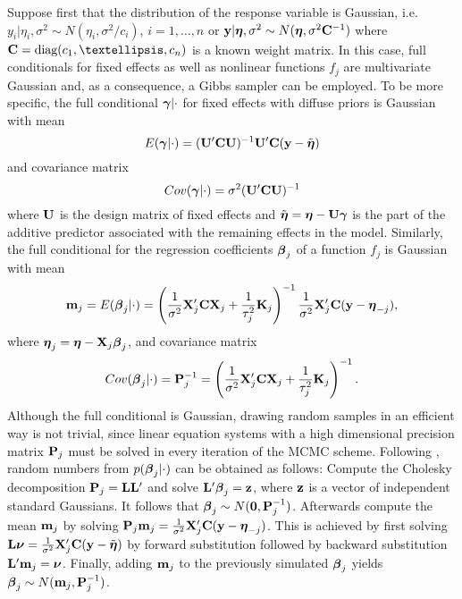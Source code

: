 \documentclass[11pt,a4paper,twoside]{bayesxarticle}
\begin{document}
Suppose first that the distribution of the response variable is
Gaussian, i.e. $y_i | \eta_i, \sigma^2 \sim N(\eta_i,\sigma^2/c_i)$,
$i=1,\dots,n$ or $\mathbf{y} | \boldsymbol{\eta}, \sigma^2 \sim N(\boldsymbol{\eta},\sigma^2 \mathbf{C}^{-1})$
where $\Cvec = \diag(c_1,\dots,c_n)$ is a known weight matrix. In this
case, full conditionals for fixed effects as well as nonlinear
functions $f_j$ are multivariate Gaussian and, as a consequence, a
Gibbs sampler can be employed. To be more specific, the full
conditional $\boldsymbol{\gamma} | \cdot$ for fixed effects with diffuse priors
is Gaussian with mean
\begin{equation}\label{meanfixed}
 E(\gammavec | \cdot) = (\Uvec'\Cvec  \Uvec)^{-1}\Uvec'\Cvec(\yvec-\tilde{\etavec})
\end{equation}
and covariance matrix
\begin{equation}
\label{covfixed} Cov(\gammavec | \cdot ) = \sigma^2 (\Uvec'\Cvec \Uvec)^{-1}
\end{equation}
where $\mathbf{U}$ is the design matrix of fixed effects and
$\tilde{\boldsymbol{\eta}}=\boldsymbol{\eta}-\mathbf{U} \boldsymbol{\gamma}$ is the part of the additive predictor
associated with the remaining effects in the model. Similarly, the
full conditional for the regression coefficients $\boldsymbol{\beta}_j$ of a
function $f_j$ is Gaussian with mean
\begin{equation}
\label{meangaussian} \mvec_j = E(\betavec_j | \cdot) = \left(
\frac{1}{\sigma^2} \Xvec_j' \Cvec \Xvec_j + \frac{1}{\tau_j^2} \Kvec_j \right)^{-1}
\frac{1}{\sigma^2}\Xvec_j' \Cvec(\yvec-\etavec_{-j}),
\end{equation}
where $\boldsymbol{\eta}_j=\boldsymbol{\eta}-\mathbf{X}_j\boldsymbol{\beta}_j$, and covariance matrix
\begin{equation}
\label{covgaussian} Cov(\betavec_j | \cdot) = \Pvec_j^{-1} = \left(
\frac{1}{\sigma^2} \Xvec_j' \Cvec \Xvec_j + \frac{1}{\tau_j^2} \Kvec_j \right)^{-1}.
\end{equation}
Although the full conditional is Gaussian, drawing random samples in an efficient way is not trivial, since linear equation
systems with a high dimensional precision matrix $\mathbf{P}_j$ must be solved in every iteration of the MCMC scheme. Following
, random numbers from $p(\boldsymbol{\beta}_j | \cdot)$ can be obtained as follows: Compute the Cholesky decomposition
$\mathbf{P}_j = \mathbf{L} \mathbf{L}'$ and solve $\mathbf{L}' \boldsymbol{\beta}_j = \mathbf{z}$, where $\mathbf{z}$ is a vector of independent standard Gaussians. It
follows that $\boldsymbol{\beta}_j \sim N(\boldsymbol{0},\mathbf{P}_j^{-1})$. Afterwards compute the mean $\mathbf{m}_j$ by solving $\mathbf{P}_j \mathbf{m}_j =
\frac{1}{\sigma^2} \mathbf{X}_j'\mathbf{C}(\mathbf{y}-\boldsymbol{\eta}_{-j})$. This is achieved by first solving $\mathbf{L} \boldsymbol{\nu} = \frac{1}{\sigma^2}
\mathbf{X}_j'\mathbf{C}(\mathbf{y}-\tilde{\boldsymbol{\eta}})$ by forward substitution followed by backward substitution $\mathbf{L}' \mathbf{m}_j = \boldsymbol{\nu}$.
Finally, adding $\mathbf{m}_j$ to the previously simulated $\boldsymbol{\beta}_j$ yields $\boldsymbol{\beta}_j \sim N(\mathbf{m}_j,\mathbf{P}_j^{-1})$.
\end{document}
